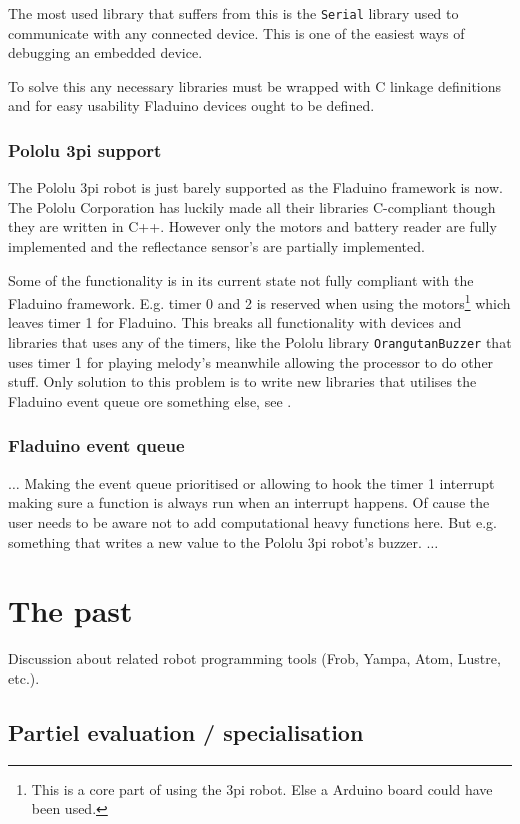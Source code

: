 \documentclass[a4paper, oneside, final]{memoir}
\let\fref\undefined
\begin{document}
The most used library that suffers from this is the \texttt{Serial} library used
to communicate with any connected device. This is one of the easiest ways of
debugging an embedded device.

To solve this any necessary libraries must be wrapped with C linkage definitions
and for easy usability Fladuino devices ought to be defined.

\subsection{Pololu 3pi support}

The Pololu 3pi robot is just barely supported as the Fladuino framework is
now. The Pololu Corporation has luckily made all their libraries C-compliant
though they are written in C++. However only the motors and battery reader are
fully implemented and the reflectance sensor's are partially implemented.

Some of the functionality is in its current state not fully compliant with the
Fladuino framework. E.g. timer 0 and 2 is reserved when using the
motors\footnote{This is a core part of using the 3pi robot. Else a Arduino board
  could have been used.} which leaves timer 1 for Fladuino. This breaks all
functionality with devices and libraries that uses any of the timers, like the
Pololu library \texttt{OrangutanBuzzer} that uses timer 1 for playing melody's
meanwhile allowing the processor to do other stuff. Only solution to this
problem is to write new libraries that utilises the Fladuino event queue ore
something else, see \fref{sec:fladuino-event-queue}.

\subsection{Fladuino event queue}
\label{sec:fladuino-event-queue}
$\ldots$
Making the event queue prioritised or allowing to hook the timer 1 interrupt
making sure a function is always run when an interrupt happens. Of cause the
user needs to be aware not to add computational heavy functions here. But
e.g. something that writes a new value to the Pololu 3pi robot's buzzer.
$\ldots$

\chapter{The past}
Discussion about related robot programming tools (Frob, Yampa, Atom,
Lustre, etc.).

\section{Partiel evaluation / specialisation} 
\end{document}

